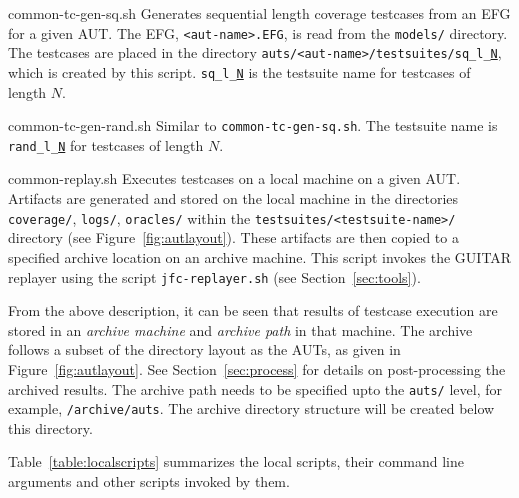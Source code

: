 \begin{smalldescription}
   \item [common-tc-gen-sq.sh] Generates sequential length coverage testcases from an EFG for a given AUT. The EFG, \texttt{<aut-name>.EFG}, is read from the \texttt{models/} directory. The testcases are placed in the directory \texttt{auts/<aut-name>/testsuites/sq\_l\_\underline{N}}, which is created by this script. \texttt{sq\_l\_\underline{N}} is the testsuite name for testcases of length $N$.
   \item [common-tc-gen-rand.sh] Similar to \texttt{common-tc-gen-sq.sh}. The testsuite name is \texttt{rand\_l\_\underline{N}} for testcases of length $N$.

   \item [common-replay.sh] Executes testcases on a local machine on a given AUT. Artifacts are generated and stored on the local machine in the directories \texttt{coverage/}, \texttt{logs/}, \texttt{oracles/} within the
   \texttt{testsuites/<testsuite-name>/} directory (see Figure~\ref{fig:autlayout}). These artifacts are then copied to a specified archive location on an archive machine. This script invokes the GUITAR replayer using the script \texttt{jfc-replayer.sh} (see Section~\ref{sec:tools}).\\

\end{smalldescription}

From the above description, it can be seen that results of testcase execution are stored in an \textit{archive machine} and \textit{archive path} in that machine. The archive follows a subset of the directory layout as the AUTs, as given in Figure~\ref{fig:autlayout}. See Section~\ref{sec:process} for details on post-processing the archived results. The archive path needs to be specified upto the \texttt{auts/} level, for example, \texttt{/archive/auts}. The archive directory structure will be created below this directory.

Table~\ref{table:localscripts} summarizes the local scripts, their command line arguments and other scripts invoked by them.\\

